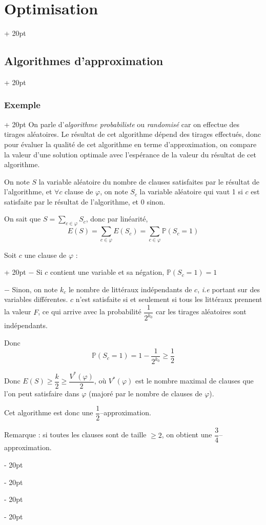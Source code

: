 \documentclass[a4paper, 12pt, twoside]{article}
\renewcommand{\ge}{\geqslant}
\newcommand{\ind}[1][20pt]{\advance\leftskip + #1}
\newcommand{\deind}[1][20pt]{\advance\leftskip - #1}
\newenvironment{indt}[2][20pt]{#2 \par \ind[#1]}{\par \deind} %
\newcommand{\1}{\mathbbm 1}
\begin{document}
\begin{indt}{\section{Optimisation}}
\begin{indt}{\subsection{Algorithmes d'approximation}}
\begin{indt}{\subsubsection{Exemple}}
                On parle d'\emph{algorithme probabiliste} ou \emph{randomisé} car on effectue des tirages aléatoires.
                Le résultat de cet algorithme dépend des tirages effectués, donc pour évaluer la qualité de cet algorithme en terme d'approximation, on compare la valeur d'une solution optimale avec l'espérance de la valeur du résultat de cet algorithme.

                On note $S$ la variable aléatoire du nombre de clauses satisfaites par le résultat de l'algorithme, et $\forall c$ clause de $\varphi$, on note $S_c$ la variable aléatoire qui vaut 1 si $c$ est satisfaite par le résultat de l'algorithme, et 0 sinon.

                On sait que $\displaystyle S = \sum_{c \in \varphi} S_c$, donc par linéarité,
                \[
                    E(S) = \sum_{c \in \varphi} E(S_c)
                    = \sum_{c \in \varphi} \mathbb P(S_c = 1)
                \]

                \begin{indt}{Soit $c$ une clause de $\varphi$ :}
                    $-$ Si $c$ contient une variable et sa négation, $\mathbb P(S_c = 1) = 1$

                    $-$ Sinon, on note $k_c$ le nombre de littéraux indépendants de $c$, \textit{i.e} portant sur des variables différentes.
                    $c$ n'est satisfaite si et seulement si tous les littéraux prennent la valeur $F$, ce qui arrive avec la probabilité $\dfrac{1}{2^{k_0}}$ car les tirages aléatoires sont indépendants.

                    Donc
                    \[
                        \mathbb P(S_c = 1) = 1 - \dfrac{1}{2^{k_0}} \ge \dfrac 1 2
                    \]

                    Donc $E(S) \ge \dfrac k 2 \ge \dfrac{V^*(\varphi)}{2}$, où $V^*(\varphi)$ est le nombre maximal de clauses que l'on peut satisfaire dans $\varphi$ (majoré par le nombre de clauses de $\varphi$).

                    Cet algorithme est donc une $\dfrac 1 2$--approximation.

                    \vspace{12pt}
                    
                    Remarque : si toutes les clauses sont de taille $\ge 2$, on obtient une $\dfrac 3 4$--approximation.
                \end{indt}
            \end{indt}
        \end{indt}
    \end{indt}
\end{document}
